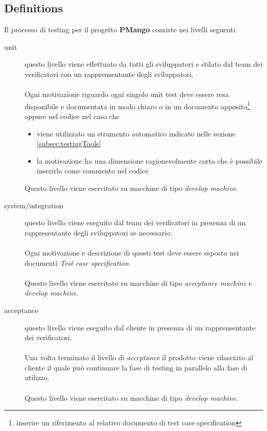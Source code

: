 \subsection{Definitions}
\label{subsec:strategy}
Il processo di testing per il progetto \textbf{PMango} consiste nei livelli
seguenti.
\begin{description} 
\item[unit] questo livello viene effettuato da tutti gli
sviluppatori e stilato dal team dei verificatori con un rapprensentante degli
sviluppatori. 
\\ \\
Ogni motivazione riguardo ogni singolo unit test deve essere resa disponibile e
documentata in modo chiaro o in un documento apposito\footnote{inserire un
riferimento al relativo documento di test case specification} oppure nel codice
nel caso che 
\begin{itemize}
	\item viene utilizzato un strumento automatico indicato nelle sezione
	\ref{subsec:testingTools}
	\item la motivazione ha una dimensione ragionevolmente corta che \`e
	possibile inserirla come commento nel codice 
\end{itemize}

Questo livello viene esercitato su macchine di tipo \emph{develop machine}.

\item[system/integration] questo livello viene eseguito dal
team dei verificatori in presenza di un rappresentante degli sviluppatori
se necessario. 
\\ \\
Ogni motivazione e descrizione di questi test deve essere esposta nei documenti
\emph{Test case specification}
\\ \\
Questo livello viene esercitato su macchine di tipo \emph{acceptance machine} e
\emph{develop machine}.

\item[acceptance] questo livello viene eseguito dal cliente in presenza di un
rapprensentante dei verificatori.
\\ \\
Una volta terminato il livello di \emph{acceptance} il prodotto viene
rilasciato al cliente il quale pu\`o continuare la fase di testing in parallelo
alla fase di utilizzo.
\\ \\
Questo livello viene esercitato su macchine di tipo \emph{develop machine}.

\end{description}

